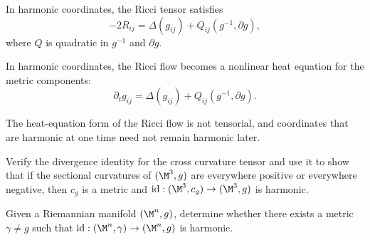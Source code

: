 \begin{lemma}
\label{ch03-lem-ricci-in-harmonic-coordinates}

In harmonic coordinates, the Ricci tensor satisfies
\[
-2R_{ij}=\Delta(g_{ij})+Q_{ij}(g^{-1},\partial g),
\]
where \(Q\) is quadratic in \(g^{-1}\) and \(\partial g\).
\end{lemma}

\begin{corollary}
\label{ch03-cor-ricci-flow-heat-equation}

In harmonic coordinates, the Ricci flow becomes a nonlinear heat equation for the metric components:
\[
\partial_t g_{ij}=\Delta(g_{ij})+Q_{ij}(g^{-1},\partial g).
\]
\end{corollary}

\begin{remark}
\label{ch03-rem-harmonic-coordinate-caution}

The heat-equation form of the Ricci flow is not tensorial, and coordinates that are harmonic at one time need not remain harmonic later.
\end{remark}

\begin{remark}
\label{ch03-ex-cross-curvature-harmonic-map}
Verify the divergence identity for the cross curvature tensor and use it to show that if the sectional curvatures of \((\M^3,g)\) are everywhere positive or everywhere negative, then \(c_g\) is a metric and \(\mathrm{id}:(\M^3,c_g)\to(\M^3,g)\) is harmonic.
\end{remark}

\begin{remark}
\label{ch03-prob-cross-curvature-harmonic-map}
Given a Riemannian manifold \((\M^n,g)\), determine whether there exists a metric \(\gamma\neq g\) such that \(\mathrm{id}:(\M^n,\gamma)\to(\M^n,g)\) is harmonic.
\end{remark}
